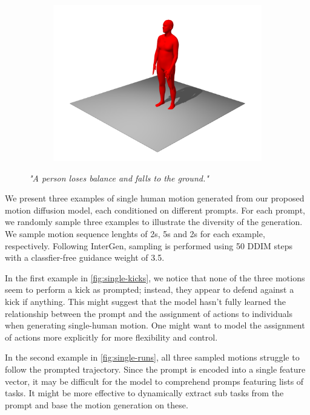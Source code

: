 \begin{figure}[H]
\begin{subfigure}{0.32\linewidth}
        \includegraphics[width=\linewidth]{figures/results/single-falls3.png}
    \end{subfigure}
    \caption{\textit{"A person loses balance and falls to the ground."}}
    \label{fig:single-fall}
\end{figure}

We present three examples of single human motion generated from our proposed motion diffusion model, each conditioned on different prompts. For each prompt, we randomly sample three examples to illustrate the diversity of the generation. We sample motion sequence lenghts of 2s, 5s and 2s for each example, respectively. Following InterGen, sampling is performed using 50 DDIM steps with a classfier-free guidance weight of 3.5.

In the first example in \cref{fig:single-kicks}, we notice that none of the three motions seem to perform a kick as prompted; instead, they appear to defend against a kick if anything. This might suggest that the model hasn't fully learned the relationship between the prompt and the assignment of actions to individuals when generating single-human motion. One might want to model the assignment of actions more explicitly for more flexibility and control. 

In the second example in \cref{fig:single-runs}, all three sampled motions struggle to follow the prompted trajectory. Since the prompt is encoded into a single feature vector, it may be difficult for the model to comprehend promps featuring lists of tasks. It might be more effective to dynamically extract sub tasks from the prompt and base the motion generation on these. 

